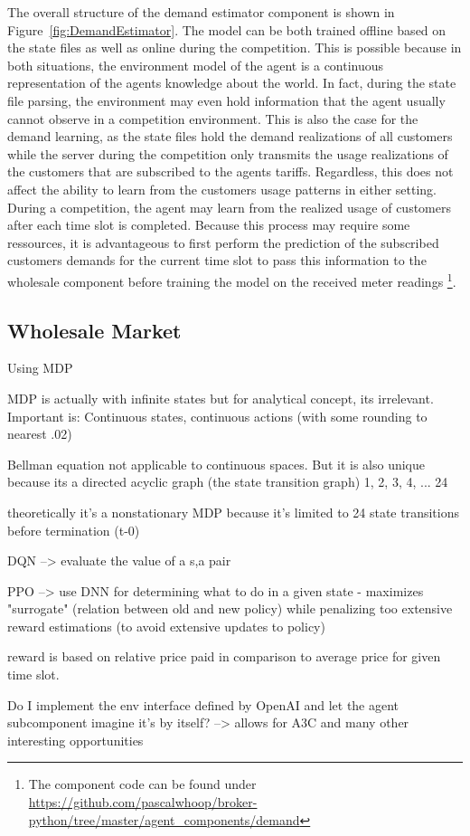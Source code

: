 The overall structure of the demand estimator component is shown in Figure~\ref{fig:DemandEstimator}. The model can be
both trained offline based on the state files as well as online during the competition. This is possible because in both
situations, the environment model of the agent is a continuous representation of the agents knowledge about the world.
In fact, during the state file parsing, the environment may even hold information that the agent usually cannot observe
in a competition environment. This is also the case for the demand learning, as the state files hold the demand
realizations of all customers while the server during the competition only transmits the usage realizations of the
customers that are subscribed to the agents tariffs. Regardless, this does not affect the ability to learn from the
customers usage patterns in either setting. During a competition, the agent may learn from the realized usage of
customers after each time slot is completed. Because this process may require some ressources, it is advantageous to
first perform the prediction of the subscribed customers demands for the current time slot to pass this information to
the wholesale component before training the model on the received meter readings \footnote{The component code can be
found under \url{https://github.com/pascalwhoop/broker-python/tree/master/agent_components/demand}}.


\subsection{Wholesale Market}
\label{sub:wholesale_market}



Using \ac {MDP} 

\ac {MDP} is actually with infinite states but for analytical concept, its irrelevant. Important is: Continuous states,
continuous actions (with some rounding to nearest .02)

Bellman equation not applicable to continuous spaces. But it is also unique because its a directed acyclic graph (the
state transition graph) 1, 2, 3, 4, ... 24

theoretically it's a nonstationary \ac {MDP} because it's limited to 24 state transitions before termination (t-0)

DQN --> evaluate the value of a s,a pair

\ac {PPO} --> use DNN for determining what to do in a given state - maximizes "surrogate" (relation between old and new
policy) while penalizing too extensive reward estimations (to avoid extensive updates to policy)

reward is based on relative price paid in comparison to average price for given time slot. 

Do I implement the env interface defined by OpenAI and let the agent subcomponent imagine it's by itself? --> allows for
A3C and many other interesting opportunities

